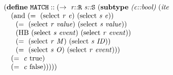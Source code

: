 \begin{equation}
\begin{array}{l}
(\cfgt{define}\ \mathtt{MATCH}::(\rightarrow\ \cfgnt{r::}\texttt{R}\ \cfgnt{s::}\texttt{S}\ (\cfgt{subtype}\ \cfgnt{(c::bool)}\ (\cfgnt{ite} \\
\ \ \ (\mathrm{and}\ (=\ (\mathrm{select}\ \mathit{r}\ \mathit{e})\ (\mathrm{select}\ \mathit{s}\ \mathit{e})) \\
\ \ \ \ \     (=\ (\mathrm{select}\ \mathit{r}\ \mathit{value})\ (\mathrm{select}\ \mathit{s}\ \mathit{value})) \\
\ \ \ \ \    (\mathrm{HB}\ (\mathrm{select}\ \mathit{s}\ \mathit{event})\ (\mathrm{select}\ \mathit{r}\ \mathit{event})) \\
\ \ \ \ \    (=\ (\mathrm{select}\ \mathit{r}\ \mathit{M})\ (\mathrm{select}\ \mathit{s}\ \mathit{ID})) \\
\ \ \ \ \    (=\ (\mathrm{select}\ \mathit{s}\ \mathit{O})\ (\mathrm{select}\ \mathit{r}\ \mathit{event}))) \\
\ \ \  (=\ \mathit{c}\ \mathrm{true}) \\
\ \ \  (=\ \mathit{c}\ \mathrm{false})))))
\end{array}
\label{equation:match}
\end{equation}

